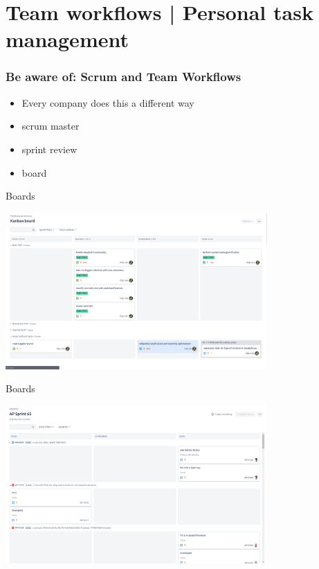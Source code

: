\documentclass[10pt]{beamer}
\begin{document}
\section{Team workflows | Personal task management}

\begin{frame}[c]
	\frametitle{Be aware of: Scrum and Team Workflows}
	\begin{itemize}[<+->]
		\item Every company does this a different way
		\item scrum master
		\item sprint review
		\item board
	\end{itemize}
\end{frame}

\begin{frame}[c]{Boards}
    \centerline{\includegraphics[width=10cm]{figs/pseboard.png}}


\end{frame}

\begin{frame}[c]{Boards}
    \centerline{\includegraphics[width=10cm]{figs/apboard.png}}

\end{frame}
\end{document}
